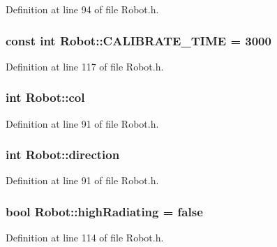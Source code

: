 Definition at line 94 of file Robot.\-h.

\hypertarget{classRobot_ac40abfa06749a68604af90c00e2a3fee}{
\subsubsection[{C\-A\-L\-I\-B\-R\-A\-T\-E\-\_\-\-T\-I\-M\-E}]{\setlength{\rightskip}{0pt plus 5cm}const int Robot\-::\-C\-A\-L\-I\-B\-R\-A\-T\-E\-\_\-\-T\-I\-M\-E = 3000\hspace{0.3cm}{\ttfamily [static]}}}\label{classRobot_ac40abfa06749a68604af90c00e2a3fee}


Definition at line 117 of file Robot.\-h.

\hypertarget{classRobot_a2e08d53491bb82defe2e28ee9ce1d096}{
\subsubsection[{col}]{\setlength{\rightskip}{0pt plus 5cm}int Robot\-::col}}\label{classRobot_a2e08d53491bb82defe2e28ee9ce1d096}


Definition at line 91 of file Robot.\-h.

\hypertarget{classRobot_ac25b4dfc2e9e5aa86ec5684d075d32b8}{
\subsubsection[{direction}]{\setlength{\rightskip}{0pt plus 5cm}int Robot\-::direction}}\label{classRobot_ac25b4dfc2e9e5aa86ec5684d075d32b8}


Definition at line 91 of file Robot.\-h.

\hypertarget{classRobot_a52d4eac720f8d9afe84ebb5f4ea4a82e}{
\subsubsection[{high\-Radiating}]{\setlength{\rightskip}{0pt plus 5cm}bool Robot\-::high\-Radiating = false}}\label{classRobot_a52d4eac720f8d9afe84ebb5f4ea4a82e}


Definition at line 114 of file Robot.\-h.

